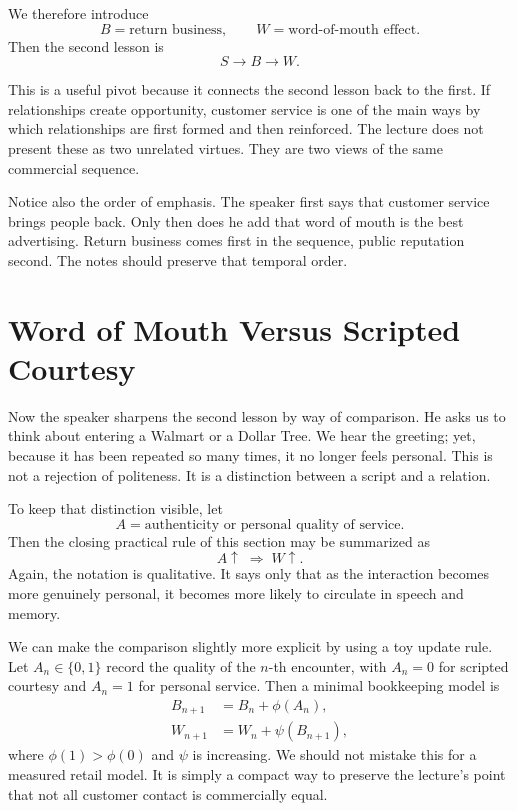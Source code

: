 We therefore introduce
\[
B = \text{return business},
\qquad
W = \text{word-of-mouth effect}.
\]
Then the second lesson is
\begin{equation}
S \to B \to W.
\end{equation}

This is a useful pivot because it connects the second lesson back to the first. If relationships create opportunity, customer service is one of the main ways by which relationships are first formed and then reinforced. The lecture does not present these as two unrelated virtues. They are two views of the same commercial sequence.

Notice also the order of emphasis. The speaker first says that customer service brings people back. Only then does he add that word of mouth is the best advertising. Return business comes first in the sequence, public reputation second. The notes should preserve that temporal order.

\section{Word of Mouth Versus Scripted Courtesy}

Now the speaker sharpens the second lesson by way of comparison. He asks us to think about entering a Walmart or a Dollar Tree. We hear the greeting; yet, because it has been repeated so many times, it no longer feels personal. This is not a rejection of politeness. It is a distinction between a script and a relation.

To keep that distinction visible, let
\[
A = \text{authenticity or personal quality of service}.
\]
Then the closing practical rule of this section may be summarized as
\begin{equation}
A \uparrow \;\Rightarrow\; W \uparrow.
\end{equation}
Again, the notation is qualitative. It says only that as the interaction becomes more genuinely personal, it becomes more likely to circulate in speech and memory.

We can make the comparison slightly more explicit by using a toy update rule. Let \(A_n \in \{0,1\}\) record the quality of the \(n\)-th encounter, with \(A_n = 0\) for scripted courtesy and \(A_n = 1\) for personal service. Then a minimal bookkeeping model is
\begin{align}
B_{n+1} &= B_n + \phi(A_n),\\
W_{n+1} &= W_n + \psi(B_{n+1}),
\end{align}
where \(\phi(1) > \phi(0)\) and \(\psi\) is increasing. We should not mistake this for a measured retail model. It is simply a compact way to preserve the lecture's point that not all customer contact is commercially equal.

